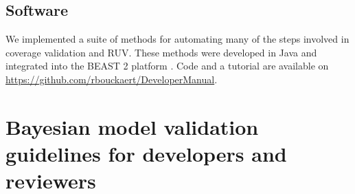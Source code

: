 \documentclass[oneside]{article}
\begin{document}



\subsection*{Software}

We implemented a suite of methods for automating many of the steps involved in coverage validation and RUV.
These methods were developed in Java and integrated into the BEAST 2 platform \citep{beast25}.
Code and a tutorial are available on \href{https://github.com/rbouckaert/DeveloperManual}{https://github.com/rbouckaert/DeveloperManual}.


\section*{Bayesian model validation guidelines for developers and reviewers}
\end{document}

